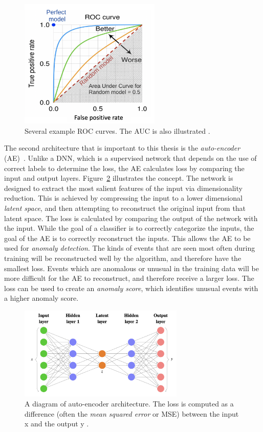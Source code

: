 \begin{figure}[!htbp]
\centering
   \includegraphics[width=0.6\textwidth]{figures/ml/roc_example}
    \caption{Several example ROC curves. The AUC is also illustrated \cite{auc_example}.
    \label{fig:roc}}
\end{figure}

The second architecture that is important to this thesis is the \textit{auto-encoder} (AE)~\cite{autoencoders}. 
Unlike a DNN, which is a supervised network that depends on the use of correct labels to determine the loss, the AE calculates loss by comparing the input and output layers.
Figure~\ref{fig:ae} illustrates the concept.
The network is designed to extract the most salient features of the input via dimensionality reduction.
This is achieved by compressing the input to a lower dimensional \textit{latent space}, and then attempting to reconstruct the original input from that latent space.
The loss is calculated by comparing the output of the network with the input.
While the goal of a classifier is to correctly categorize the inputs, the goal of the AE is to correctly reconstruct the inputs.
This allows the AE to be used for \textit{anomaly detection}.
The kinds of events that are seen most often during training will be reconstructed well by the algorithm, and therefore have the smallest loss.
Events which are anomalous or unusual in the training data will be more difficult for the AE to reconstruct, and therefore receive a larger loss. 
The loss can be used to create an \textit{anomaly score}, which identifies unusual events with a higher anomaly score.

\begin{figure}[!htbp]
\centering
   \includegraphics[width=0.7\textwidth]{figures/ml/ae}
    \caption{A diagram of auto-encoder architecture. The loss is computed as a difference (often the \textit{mean squared error} or MSE) between the input x and the output y \cite{vrnn}.
    \label{fig:ae}}
\end{figure}




